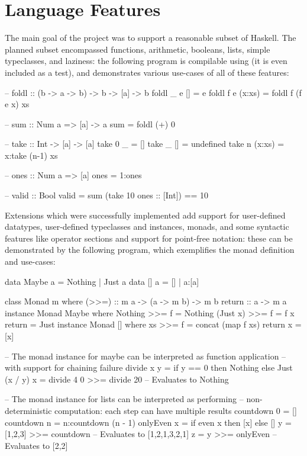 \documentclass[dissertation.tex]{subfiles}
\begin{document}
\section{Language Features}
{
    The main goal of the project was to support a reasonable subset of Haskell. The planned subset encompassed functions, arithmetic, booleans, lists, simple typeclasses, and laziness: the following program is compilable using \compilername (it is even included as a test), and demonstrates various use-cases of all of these features:

    \begin{haskellfigure}
    -- foldl :: (b -> a -> b) -> b -> [a] -> b
    foldl _ e [] = e
    foldl f e (x:xs) = foldl f (f e x) xs

    -- sum :: Num a => [a] -> a
    sum = foldl (+) 0

    -- take :: Int -> [a] -> [a]
    take 0 _ = []
    take _ [] = undefined
    take n (x:xs) = x:take (n-1) xs

    -- ones :: Num a => [a]
    ones = 1:ones

    -- valid :: Bool
    valid = sum (take 10 ones :: [Int]) == 10
    \end{haskellfigure}

    Extensions which were successfully implemented add support for user-defined datatypes, user-defined typeclasses and instances, monads, and some syntactic features like operator sections and support for point-free notation: these can be demonstrated by the following program, which exemplifies the monad definition and use-cases:

    \begin{haskellfigure}
    data Maybe a = Nothing | Just a
    data [] a = [] | a:[a]
    
    class Monad m where
        (>>=) :: m a -> (a -> m b) -> m b
        return :: a -> m a
    instance Monad Maybe where
        Nothing >>= f = Nothing
        (Just x) >>= f = f x
        return = Just
    instance Monad [] where
        xs >>= f = concat (map f xs)
        return x = [x]

    -- The monad instance for maybe can be interpreted as function application
    -- with support for chaining failure
    divide x y = if y == 0 then Nothing else Just (x / y)
    x = divide 4 0 >>= divide 20 -- Evaluates to Nothing

    -- The monad instance for lists can be interpreted as performing
    -- non-deterministic computation: each step can have multiple results
    countdown 0 = []
    countdown n = n:countdown (n - 1)
    onlyEven x = if even x then [x] else []
    y = [1,2,3] >>= countdown -- Evaluates to [1,2,1,3,2,1]
    z = y >>= onlyEven -- Evaluates to [2,2]
    \end{haskellfigure}

}
\end{document}
